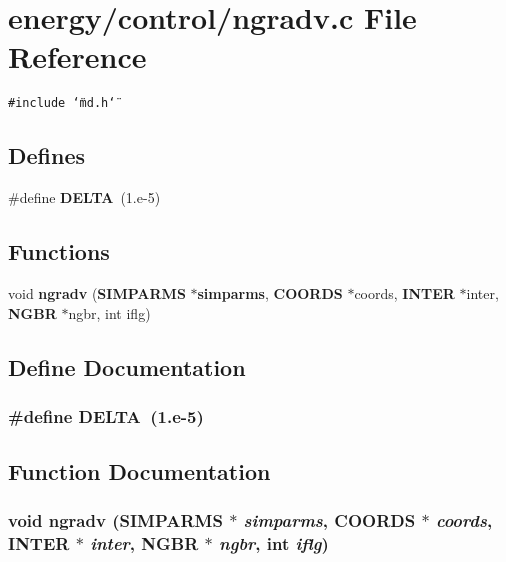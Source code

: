\section{energy/control/ngradv.c File Reference}
\label{ngradv_8c}
{\tt \#include \char`\"{}md.h\char`\"{}}\par
\subsection*{Defines}
\begin{CompactItemize}
\item 
\#define {\bf DELTA}~(1.e-5)
\end{CompactItemize}
\subsection*{Functions}
\begin{CompactItemize}
\item 
void {\bf ngradv} ({\bf SIMPARMS} $\ast${\bf simparms}, {\bf COORDS} $\ast$coords, {\bf INTER} $\ast$inter, {\bf NGBR} $\ast$ngbr, int iflg)
\end{CompactItemize}


\subsection{Define Documentation}
\subsubsection{\setlength{\rightskip}{0pt plus 5cm}\#define DELTA~(1.e-5)}\label{ngradv_8c_3fd2b1bcd7ddcf506237987ad780f495}




\subsection{Function Documentation}
\subsubsection{\setlength{\rightskip}{0pt plus 5cm}void ngradv ({\bf SIMPARMS} $\ast$ {\em simparms}, {\bf COORDS} $\ast$ {\em coords}, {\bf INTER} $\ast$ {\em inter}, {\bf NGBR} $\ast$ {\em ngbr}, int {\em iflg})}\label{ngradv_8c_42d991234ac5d82d01f595fa4ee9000b}


